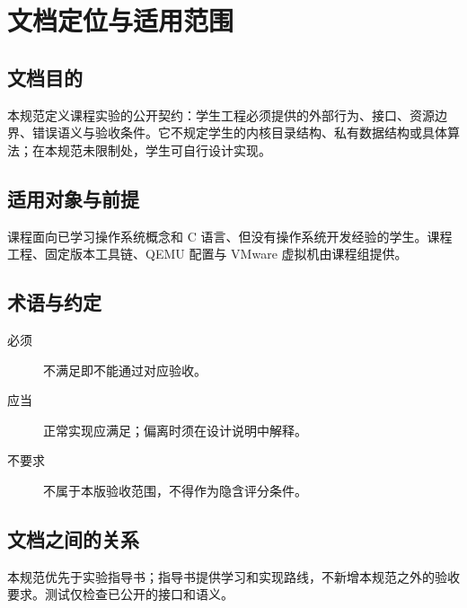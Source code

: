 \chapter{文档定位与适用范围}

\section{文档目的}
本规范定义课程实验的公开契约：学生工程必须提供的外部行为、接口、资源边界、错误语义与验收条件。它不规定学生的内核目录结构、私有数据结构或具体算法；在本规范未限制处，学生可自行设计实现。

\section{适用对象与前提}
课程面向已学习操作系统概念和 C 语言、但没有操作系统开发经验的学生。课程工程、固定版本工具链、QEMU 配置与 VMware 虚拟机由课程组提供。

\section{术语与约定}
\begin{description}
  \item[必须] 不满足即不能通过对应验收。
  \item[应当] 正常实现应满足；偏离时须在设计说明中解释。
  \item[不要求] 不属于本版验收范围，不得作为隐含评分条件。
\end{description}

\section{文档之间的关系}
本规范优先于实验指导书；指导书提供学习和实现路线，不新增本规范之外的验收要求。测试仅检查已公开的接口和语义。
